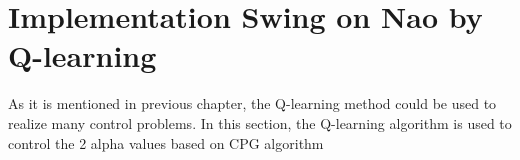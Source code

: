 \section{Implementation Swing on Nao by Q-learning }
As it is mentioned in previous chapter, the Q-learning method could be used to realize many control problems. In this section, the Q-learning algorithm is used to control the 2 alpha values based on CPG algorithm





















